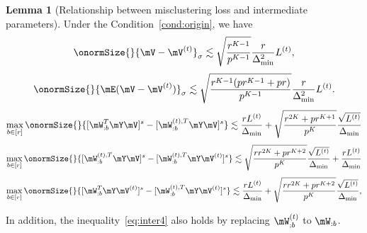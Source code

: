 \documentclass[lettersize,onecolumn,journal]{IEEEtran}
\theoremstyle{definition}
\newtheorem{lem}{Lemma}
\theoremstyle{definition}
\begin{document}
     \begin{lem}[Relationship between misclustering loss and intermediate parameters]\label{lem:intermediate} Under the Condition~\ref{cond:origin}, we have
    \begin{equation}\label{eq:inter1}
        \onormSize{}{\mV - \mV^{(t)}}_{\sigma} \lesssim \sqrt{\frac{r^{K-1}}{p^{K-1}}}  \frac{r}{\Delta_{\min}^2} L^{(t)},
    \end{equation}
    \begin{equation}\label{eq:inter2}
        \onormSize{}{\mE (\mV - \mV^{(t)})}_{\sigma} \lesssim \sqrt{ \frac{r^{K-1}(p r^{K-1} + p r)}{p^{K-1}}} 
 \frac{r}{\Delta_{\min}^2} L^{(t)}.    
 \end{equation}
 \begin{equation}\label{eq:inter3}
     \max_{b \in [r]} \onormSize{}{ [ \mW_{:b}^T \mY \mV ]^s   -  [ \mW_{:b}^{(t), T} \mY \mV  ]^s } \lesssim \frac{r L^{(t)}}{\Delta_{\min}} + \sqrt{ \frac{r^{2K} + pr^{K+1}}{p^{K}} } \frac{\sqrt{L^{(t)}}}{\Delta_{\min}}
 \end{equation}
 \begin{equation}\label{eq:inter4}
     \max_{b \in [r]} \onormSize{}{  [  \mW_{:b}^{(t), T}  \mY \mV]^s - [  \mW_{:b}^{(t), T}  \mY \mV^{(t)}]^s } \lesssim  \sqrt{ \frac{rr^{2K} + p r^{K+2}}{p^{K}}}  \frac{\sqrt{L^{(t)}}}{\Delta_{\min}} +  \frac{r L^{(t)}}{\Delta_{\min}}
     \end{equation}
    \begin{equation}\label{eq:inter5}
         \max_{b \in [r]} \onormSize{}{ [\mW_{:b}^T \mY \mV^{(t)} ]^s   -  [ \mW_{:b}^{(t), T} \mY \mV^{(t)} ]^s } \lesssim \frac{rL^{(t)}}{\Delta_{\min}} + \sqrt{ \frac{rr^{2K} + p r^{K+2}}{p^{K}}}  \frac{\sqrt{L^{(t)}}}{\Delta_{\min}},
    \end{equation}
    
    In addition, the inequality~\eqref{eq:inter4} also holds by replacing $\mW_{:b}^{(t)}$ to $\mW_{:b}$.
    \end{lem}
        
\end{document}
